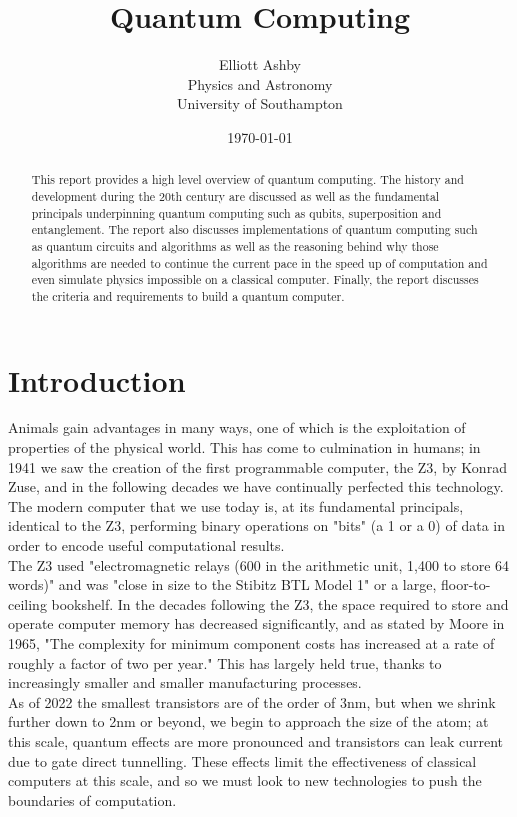 \documentclass[reqno]{amsart}
\title{Quantum Computing}
\author[Elliott Ashby]{Elliott Ashby \\ Physics and Astronomy \\ University of Southampton}
\date{\monthyeardate\today}
\numberwithin{equation}{section}
\numberwithin{figure}{section}
\begin{document}
\begin{abstract}
    This report provides a high level overview of quantum computing. The history and development during the 20th century are discussed as well as the fundamental principals underpinning quantum computing such as qubits, superposition and entanglement. The report also discusses implementations of quantum computing such as quantum circuits and algorithms as well as the reasoning behind why those algorithms are needed to continue the current pace in the speed up of computation and even simulate physics impossible on a classical computer. Finally, the report discusses the criteria and requirements to build a quantum computer.
\end{abstract}
\maketitle
\tableofcontents
\section{Introduction}
\begin{justify}
Animals gain advantages in many ways, one of which is the exploitation of properties of the physical world. This has come to culmination in humans; in 1941 we saw the creation of the first programmable computer, the Z3, by Konrad Zuse, and in the following decades we have continually perfected this technology. The modern computer that we use today is, at its fundamental principals, identical to the Z3, performing binary operations on "bits" (a 1 or a 0) of data in order to encode useful computational results. \\

The Z3 used "electromagnetic relays (600 in the arithmetic unit, 1,400 to store 64 words)" and was "close in size to the Stibitz BTL Model 1" or a large, floor-to-ceiling bookshelf. \cite{KonradZuseObituary} In the decades following the Z3, the space required to store and operate computer memory has decreased significantly, and as stated by Moore in 1965, "The complexity for minimum component costs has increased at a rate of roughly a factor of two per year." \cite{Moore1965} This has largely held true, thanks to increasingly smaller and smaller manufacturing processes. \\

As of 2022 the smallest transistors are of the order of 3nm, \cite{Samsung_2022} but when we shrink further down to 2nm or beyond, we begin to approach the size of the atom; at this scale, quantum effects are more pronounced and transistors can leak current due to gate direct tunnelling. \cite{2nmGateOxide} These effects limit the effectiveness of classical computers at this scale, and so we must look to new technologies to push the boundaries of computation.
\end{justify}
\end{document}
